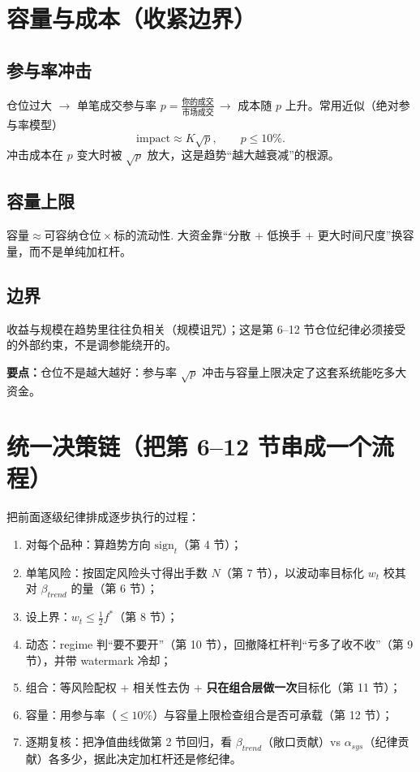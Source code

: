 \documentclass[UTF8,11pt]{ctexart}
\newcommand{\takeaway}[1]{\medskip\par\noindent\textbf{要点：}#1\par\medskip}
\begin{document}
\section{容量与成本（收紧边界）}
\subsection{参与率冲击}
仓位过大 $\to$ 单笔成交参与率 $p=\frac{\text{你的成交}}{\text{市场成交}}\,\to$ 成本随 $p$ 上升。常用近似（绝对参与率模型）
\begin{equation}
\text{impact} \approx K\sqrt{p},\qquad p\le 10\%.
\end{equation}
冲击成本在 $p$ 变大时被 $\sqrt p$ 放大，这是趋势“越大越衰减”的根源。
\subsection{容量上限}
$
\text{容量} \approx \text{可容纳仓位}\times\text{标的流动性}.
$
大资金靠“分散 $+$ 低换手 $+$ 更大时间尺度”换容量，而不是单纯加杠杆。
\subsection{边界}
收益与规模在趋势里往往负相关（规模诅咒）；这是第 6--12 节仓位纪律必须接受的外部约束，不是调参能绕开的。
\takeaway{仓位不是越大越好：参与率 $\sqrt p$ 冲击与容量上限决定了这套系统能吃多大资金。}

\section{统一决策链（把第 6--12 节串成一个流程）}
把前面逐级纪律排成逐步执行的过程：
\begin{enumerate}[itemsep=2pt]
\item 对每个品种：算趋势方向 $\mathrm{sign}_t$（第 4 节）；
\item 单笔风险：按固定风险头寸得出手数 $N$（第 7 节），以波动率目标化 $w_t$ 校其对 $\beta_{trend}$ 的量（第 6 节）；
\item 设上界：$w_t\le\tfrac12 f^{*}$（第 8 节）；
\item 动态：regime 判“要不要开”（第 10 节），回撤降杠杆判“亏多了收不收”（第 9 节），并带 watermark 冷却；
\item 组合：等风险配权 + 相关性去伪 + \textbf{只在组合层做一次}目标化（第 11 节）；
\item 容量：用参与率（$\le10\%$）与容量上限检查组合是否可承载（第 12 节）；
\item 逐期复核：把净值曲线做第 2 节回归，看 $\beta_{trend}$（敞口贡献）vs $\alpha_{sys}$（纪律贡献）各多少，据此决定加杠杆还是修纪律。
\end{enumerate}
\end{document}
